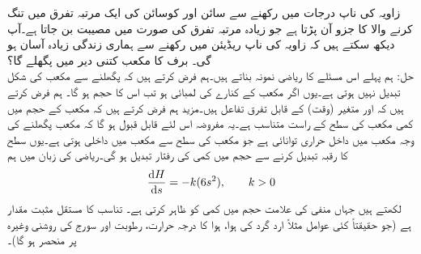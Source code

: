 زاویہ کی ناپ درجات میں رکھنے سے سائن اور کوسائن کی ایک مرتبہ تفرق میں تنگ کرنے والا  کا جزو آن پڑتا ہے جو زیادہ مرتبہ تفرق کی صورت میں مصیبت بن  جاتا ہے۔آپ دیکھ سکتے ہیں کہ زاویہ کی ناپ ریڈیئن میں رکھنے سے ہماری زندگی زیادہ آسان ہو گی۔
برف کا مکعب کتنی دیر میں پگھلے گا؟\\
حل:\quad
ہم پہلے اس مسئلے کا ریاضی نمونہ بناتے ہیں۔ہم فرض کرتے ہیں کہ پگھلنے سے مکعب کی شکل تبدیل نہیں ہوتی ہے۔یوں اگر مکعب کے کنارے کی لمبائی  ہو تب اس کا حجم  ہو گا۔ ہم فرض کرتے ہیں کہ  اور  متغیر  (وقت) کے قابل تفرق تفاعل ہیں۔مزید ہم فرض کرتے ہیں کہ مکعب کے حجم میں کمی  مکعب کی سطح کے راست متناسب ہے۔یہ مفروضہ اس لئے قابل قبول ہو گا کہ مکعب پگھلنے کی وجہ مکعب میں داخل حراری توانائی ہے جو مکعب کی سطح سے مکعب میں داخلی ہوتی ہے۔یوں سطح کا رقبہ تبدیل کرنے سے حجم میں کمی کی رفتار تبدیل ہو گی۔ریاضی کی زبان میں ہم
\begin{align*}
\frac{\dif H}{\dif s}=-k(6s^2),\quad\quad k>0
\end{align*}
لکھتے ہیں جہاں منفی کی علامت حجم میں کمی کو ظاہر کرتی ہے۔ تناسب کا مستقل  مثبت مقدار ہے (جو حقیقتاً کئی عوامل مثلاً ارد گرد کی ہوا، ہوا کا درجہ حرارت، رطوبت اور سورج کی روشنی وغیرہ پر منحصر ہو گا)۔

